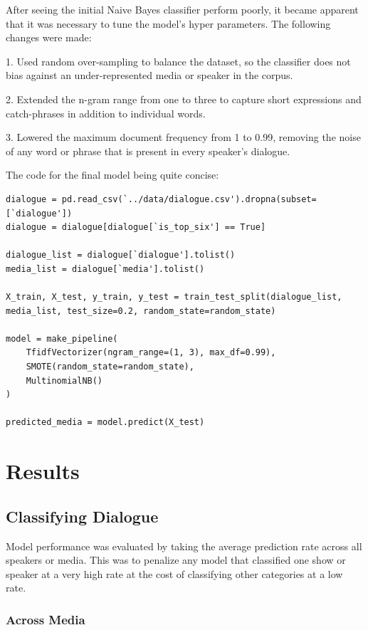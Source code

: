 \documentclass{article}
\begin{document}
\begin{titlepage}
After seeing the initial Naive Bayes classifier perform poorly, it became apparent that it was necessary to tune the model's hyper parameters. The following changes were made:

1. Used random over-sampling to balance the dataset, so the classifier does not bias against an under-represented media or speaker in the corpus.

2. Extended the n-gram range from one to three to capture short expressions and catch-phrases in addition to individual words.

3. Lowered the maximum document frequency from 1 to 0.99, removing the noise of any word or phrase that is present in every speaker's dialogue.

The code for the final model being quite concise:

\begin{verbatim}
dialogue = pd.read_csv(`../data/dialogue.csv').dropna(subset=[`dialogue'])
dialogue = dialogue[dialogue[`is_top_six'] == True]

dialogue_list = dialogue[`dialogue'].tolist()
media_list = dialogue[`media'].tolist()

X_train, X_test, y_train, y_test = train_test_split(dialogue_list, media_list, test_size=0.2, random_state=random_state)

model = make_pipeline(
    TfidfVectorizer(ngram_range=(1, 3), max_df=0.99),
    SMOTE(random_state=random_state),
    MultinomialNB()
)

predicted_media = model.predict(X_test)
\end{verbatim}

\section{Results}

\subsection{Classifying Dialogue}

Model performance was evaluated by taking the average prediction rate across all speakers or media. This was to penalize any model that classified one show or speaker at a very high rate at the cost of classifying other categories at a low rate.


\subsubsection{Across Media}


\end{titlepage}
\end{document}
